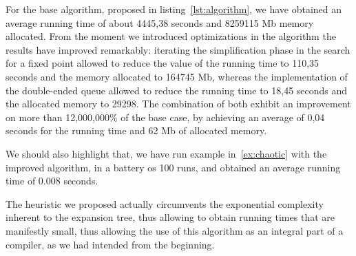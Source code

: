For the base algorithm, proposed in listing~\ref{lst:algorithm},
we have obtained an average running time of about 4445,38 seconds
and 8259115 Mb memory allocated. From the moment we introduced
optimizations in the algorithm the results have improved remarkably:
iterating the simplification phase in the search for a fixed point
allowed to reduce the value of the running time to 110,35 seconds and
the memory allocated to 164745 Mb, whereas the implementation of the
double-ended queue allowed to reduce the running time to 18,45 seconds
and the allocated memory to 29298. The combination of both exhibit an
improvement on more than 12,000,000\% of the base case, by
achieving an average of 0,04 seconds for the running time and 62 Mb
of allocated memory.

We should also highlight that, we have run example in~\eqref{ex:chaotic} 
with the improved algorithm, in a battery os 100 runs, and obtained an
average running time of 0.008 seconds. 

The heuristic we proposed actually circumvents the exponential complexity 
inherent to the expansion tree, thus allowing to obtain running times that 
are manifestly small, thus allowing the use of this algorithm as an integral 
part of a compiler, as we had intended from the beginning.

